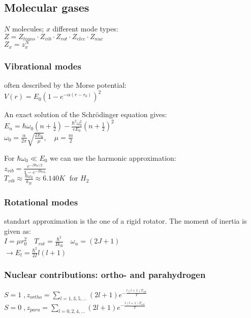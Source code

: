 \subsection*{Molecular gases}
$N$ molecules; $x$ different mode types: \\
\(Z = Z_{trans} \cdot Z_{vib} \cdot Z_{rot} \cdot Z_{elec} \cdot Z_{nuc}\) \\
\(Z_x = z_x^N\)

\subsubsection*{Vibrational modes}
often described by the Morse potential:\\
\(V(r) = E_0 \left(1- e^{-\alpha (r-r_0)}\right)^2\)

An exact solution of the Schrödinger equation gives:\\
\(E_n = \hbar \omega_0 \left(n + \frac{1}{2}\right) - \frac{\hbar^2 \omega_0^2}{e E_0} \left(n + \frac{1}{2}\right)^2\) \\
\(\omega_0 = \frac{\alpha}{2 \pi} \sqrt{\frac{2 E_0}{\mu}} , \quad \mu = \frac{m}{2}\)

For $\hbar \omega_0 \ll E_0 $ we can use the harmonic approximation:\\
\(z_{vib} = \frac{e^{-\beta \hbar \omega /2}}{1- e^{- \beta \hbar \omega_0}}\)\\
\(T_{vib} \approx \frac{\hbar \omega_0}{k_B} \approx 6.140 K \; \text{ for } H_2\)

\subsubsection*{Rotational modes}
standart approximation is the one of a rigid rotator. The moment of inertia is given as: \\
\(I = \mu r_0^2 \quad T_{rot} = \frac{\hbar^2}{I k_B} \quad \omega_n = (2J +1)\)\\
\(\rightarrow E_l = \frac{\hbar^2}{2I} l(l+1)\)

\subsubsection*{Nuclear contributions: ortho- and parahydrogen}
\(S=1 \; , z_{ortho} = \sum_{l=1,3,5,\dots} (2l +1) e^{- \frac{l(l+1) T_{rot}}{T}}\) \\
\(S=0 \; , z_{para} = \sum_{l=0,2,4,\dots} (2l +1) e^{- \frac{l(l+1) T_{rot}}{T}}\)

